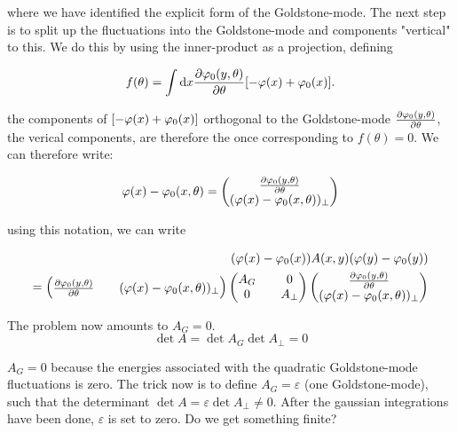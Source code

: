 where we have identified the explicit form of the Goldstone-mode. The next step is to split up the fluctuations into the Goldstone-mode and components "vertical" to this. We do this by using the inner-product as a projection, defining 

\begin{equation*}
    f(\theta) = \int \dd x \pdv{\varphi_0(y,\theta)}{\theta} [-\varphi(x) + \varphi_0(x)].
\end{equation*}

the components of $[-\varphi(x) + \varphi_0(x)]$ orthogonal to the Goldstone-mode $\pdv{\varphi_0(y,\theta)}{\theta}$, the verical components, are therefore the once corresponding to $f(\theta) = 0$. We can therefore write: 

\begin{align*}
    \varphi(x) - \varphi_0(x,\theta) = \begin{pmatrix} \pdv{\varphi_0(y,\theta)}{\theta} \\ (\varphi(x) - \varphi_0(x,\theta))_{\perp} \end{pmatrix}
\end{align*}

using this notation, we can write 

\begin{align*}
    (\varphi(x) - \varphi_0(x)) A(x,y) (\varphi(y) - \varphi_0(y)) \\ 
    = \begin{pmatrix} \pdv{\varphi_0(y,\theta)}{\theta} && (\varphi(x) - \varphi_0(x,\theta))_{\perp} \end{pmatrix} \begin{pmatrix} A_G && 0 \\ 0 && A_{\perp} \end{pmatrix} \begin{pmatrix} \pdv{\varphi_0(y,\theta)}{\theta} \\ (\varphi(x) - \varphi_0(x,\theta))_{\perp} \end{pmatrix}
\end{align*}

The problem now amounts to $A_G = 0$. \\ 

\begin{equation*}
    \det A = \det A_G \det A_{\perp} = 0
\end{equation*}

$A_G = 0$ because the energies associated with the quadratic Goldstone-mode fluctuations is zero. The trick now is to define $A_G = \varepsilon$ (one Goldstone-mode), such that the determinant $\det A = \varepsilon \det A_{\perp} \neq 0$. After the gaussian integrations have been done, $\varepsilon$ is set to zero. Do we get something finite? \\ 

